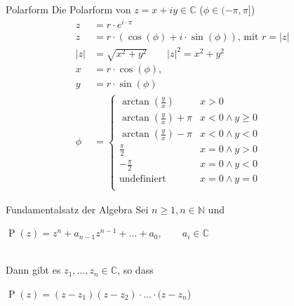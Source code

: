 \documentclass[a4paper,10pt]{article}
\begin{document}
\begin{mainbox}{Polarform}
	Die Polarform von $z = x + iy \in \mathbb{C}$ ($\phi \in (- \pi, \pi]$) 
	\begin{align*}
		z                                     & = r \cdot e^{i \cdot \pi}                                       \\
		z                                     & = r \cdot (\cos(\phi) + i \cdot \sin(\phi))\text{, mit }r = |z| \\
		|z|                                   & = \sqrt{x^2 + y^2}\qquad |z|^2 = x^2+y^2                        \\
		x                                     & = r \cdot \cos(\phi),                                           \\
		y                                     & = r \cdot \sin(\phi)                                            \\
		\phi                                  & =                                                               
		\begin{cases}
		\arctan\left(\frac{y}{x}\right)       & x > 0                                                           \\
		\arctan\left(\frac{y}{x}\right) + \pi & x < 0 \land y \geqslant 0                                       \\
		\arctan\left(\frac{y}{x}\right) - \pi & x < 0 \land y < 0                                               \\
		\frac{\pi}{2}                         & x = 0  \land y > 0                                              \\
		- \frac{\pi}{2}                       & x = 0 \land y < 0                                               \\
		\text{undefiniert}                    & x = 0 \land y = 0                                               \\
		\end{cases}
		\
	\end{align*}
	  
\end{mainbox}

\begin{mainbox}{Fundamentalsatz der Algebra}
	Sei $n\geq 1, n\in \mathbb{N}$ und\\ 
	\centerline{$\operatorname{P}(z)=z^n+a_{n-1}z^{n-1}+\dots+a_0, \qquad a_i\in \mathbb{C}$}\\
	Dann gibt es $z_1,\dots,z_n \in \mathbb{C}$, so dass\\
	\centerline{$\operatorname{P}(z)=(z-z_1)(z-z_2)\cdot \dotsc \cdot (z-z_n$)}
\end{mainbox}
\end{document}
